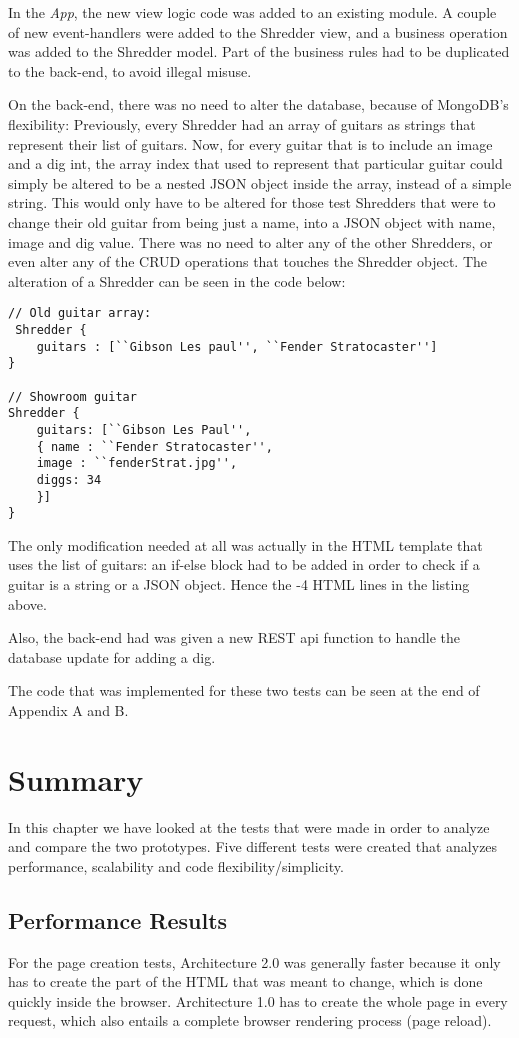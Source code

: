 In the \textit{App}, the new view logic code was added to an existing module. A couple of new event-handlers were added to the Shredder view, and a business operation was added to the Shredder model. Part of the business rules had to be duplicated to the back-end, to avoid illegal misuse.

On the back-end, there was no need to alter the database, because of MongoDB's flexibility: Previously, every Shredder had an array of guitars as strings that represent their list of guitars. Now, for every guitar that is to include an image and a dig int, the array index that used to represent that particular guitar could simply be altered to be a nested JSON object inside the array, instead of a simple string. This would only have to be altered for those test Shredders that were to change their old guitar from being just a name, into a JSON object with name, image and dig value. There was no need to alter any of the other Shredders, or even alter any of the CRUD operations that touches the Shredder object. The alteration of a Shredder can be seen in the code below:
\begin{lstlisting}
// Old guitar array:
 Shredder {
	guitars : [``Gibson Les paul'', ``Fender Stratocaster'']
}

// Showroom guitar
Shredder {
	guitars: [``Gibson Les Paul'',
	{ name : ``Fender Stratocaster'',
	image : ``fenderStrat.jpg'',
	diggs: 34
	}]
}
\end{lstlisting}

The only modification needed at all was actually in the HTML template that uses the list of guitars: an if-else block had to be added in order to check if a guitar is a string or a JSON object. Hence the -4 HTML lines in the listing above.

Also, the back-end had was given a new REST api function to handle the database update for adding a dig. 

The code that was implemented for these two tests can be seen at the end of Appendix A and B.

\section{Summary}
In this chapter we have looked at the tests that were made in order to analyze and compare the two prototypes. Five different tests were created that analyzes performance, scalability and code flexibility/simplicity.

\subsection{Performance Results}
For the page creation tests, Architecture 2.0 was generally faster because it only has to create the part of the HTML that was meant to change, which is done quickly inside the browser. Architecture 1.0 has to create the whole page in every request,  which also entails a complete browser rendering process (page reload). 

